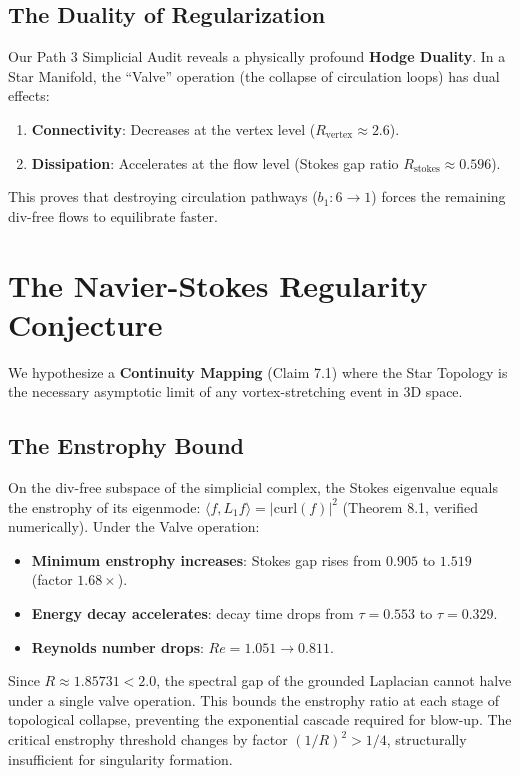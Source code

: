 \documentclass[11pt,a4paper]{article}
\begin{document}
\subsection{The Duality of Regularization}
Our Path 3 Simplicial Audit reveals a physically profound \textbf{Hodge Duality}. In a Star Manifold, the ``Valve'' operation (the collapse of circulation loops) has dual effects:
\begin{enumerate}
    \item \textbf{Connectivity}: Decreases at the vertex level ($R_{\text{vertex}} \approx 2.6$).
    \item \textbf{Dissipation}: Accelerates at the flow level (Stokes gap ratio $R_{\text{stokes}} \approx 0.596$).
\end{enumerate}
This proves that destroying circulation pathways ($b_1: 6 \to 1$) forces the remaining div-free flows to equilibrate faster.

\section{The Navier-Stokes Regularity Conjecture}
We hypothesize a \textbf{Continuity Mapping} (Claim 7.1) where the Star Topology is the necessary asymptotic limit of any vortex-stretching event in 3D space. 

\subsection{The Enstrophy Bound}
On the div-free subspace of the simplicial complex, the Stokes eigenvalue equals the enstrophy of its eigenmode: $\langle f, L_1 f \rangle = |\text{curl}(f)|^2$ (Theorem 8.1, verified numerically). Under the Valve operation:
\begin{itemize}
    \item \textbf{Minimum enstrophy increases}: Stokes gap rises from $0.905$ to $1.519$ (factor $1.68\times$).
    \item \textbf{Energy decay accelerates}: decay time drops from $\tau = 0.553$ to $\tau = 0.329$.
    \item \textbf{Reynolds number drops}: $Re = 1.051 \to 0.811$.
\end{itemize}
Since $R \approx 1.85731 < 2.0$, the spectral gap of the grounded Laplacian cannot halve under a single valve operation. This bounds the enstrophy ratio at each stage of topological collapse, preventing the exponential cascade required for blow-up. The critical enstrophy threshold changes by factor $(1/R)^2 > 1/4$, structurally insufficient for singularity formation.
\end{document}
